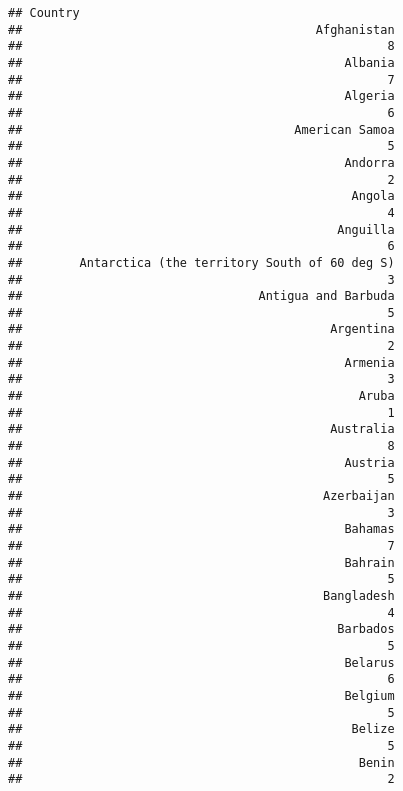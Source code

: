 \documentclass[
]{article}
\begin{document}
\begin{verbatim}
## Country
##                                         Afghanistan 
##                                                   8 
##                                             Albania 
##                                                   7 
##                                             Algeria 
##                                                   6 
##                                      American Samoa 
##                                                   5 
##                                             Andorra 
##                                                   2 
##                                              Angola 
##                                                   4 
##                                            Anguilla 
##                                                   6 
##        Antarctica (the territory South of 60 deg S) 
##                                                   3 
##                                 Antigua and Barbuda 
##                                                   5 
##                                           Argentina 
##                                                   2 
##                                             Armenia 
##                                                   3 
##                                               Aruba 
##                                                   1 
##                                           Australia 
##                                                   8 
##                                             Austria 
##                                                   5 
##                                          Azerbaijan 
##                                                   3 
##                                             Bahamas 
##                                                   7 
##                                             Bahrain 
##                                                   5 
##                                          Bangladesh 
##                                                   4 
##                                            Barbados 
##                                                   5 
##                                             Belarus 
##                                                   6 
##                                             Belgium 
##                                                   5 
##                                              Belize 
##                                                   5 
##                                               Benin 
##                                                   2 

\end{verbatim}
\end{document}
